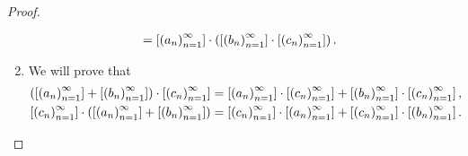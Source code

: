 \begin{proof}
\begin{enumerate}[label={(F\arabic*)},itemsep=0pt,start=5]
\begin{align*}
                                                                                                   & = \class{\seq{a_{n}}}\cdot\left(\class{\seq{b_{n}}}\cdot\class{\seq{c_{n}}}\right).
              \end{align*}
        \item We will prove that
              \[
                  \begin{split}
                      \left(\class{\seq{a_{n}}} + \class{\seq{b_{n}}}\right)\cdot\class{\seq{c_{n}}} = \class{\seq{a_{n}}}\cdot\class{\seq{c_{n}}} + \class{\seq{b_{n}}}\cdot\class{\seq{c_{n}}}, \\
                      \class{\seq{c_{n}}}\cdot\left(\class{\seq{a_{n}}} + \class{\seq{b_{n}}}\right) = \class{\seq{c_{n}}}\cdot\class{\seq{a_{n}}} + \class{\seq{c_{n}}}\cdot\class{\seq{b_{n}}}.
                  \end{split}
              \]


\end{enumerate}
\end{proof}
